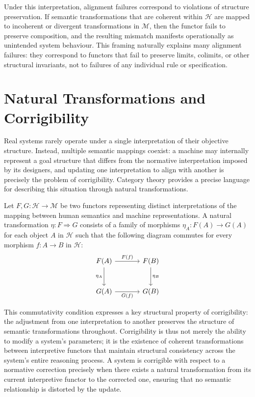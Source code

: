 \documentclass[12pt]{article}
\theoremstyle{definition}
\begin{document}
Under this interpretation, alignment failures correspond to violations of
structure preservation. If semantic transformations that are coherent within
$\mathcal{H}$ are mapped to incoherent or divergent transformations in
$\mathcal{M}$, then the functor fails to preserve composition, and the resulting
mismatch manifests operationally as unintended system behaviour. This framing
naturally explains many alignment failures: they correspond to functors that fail
to preserve limits, colimits, or other structural invariants, not to failures of
any individual rule or specification.

\section{Natural Transformations and Corrigibility}

Real systems rarely operate under a single interpretation of their objective
structure. Instead, multiple semantic mappings coexist: a machine may internally
represent a goal structure that differs from the normative interpretation imposed
by its designers, and updating one interpretation to align with another is
precisely the problem of corrigibility. Category theory provides a precise
language for describing this situation through natural transformations.

Let $F, G : \mathcal{H} \to \mathcal{M}$ be two functors representing distinct
interpretations of the mapping between human semantics and machine
representations. A natural transformation $\eta : F \Rightarrow G$ consists of
a family of morphisms $\eta_A : F(A) \to G(A)$ for each object $A$ in
$\mathcal{H}$ such that the following diagram commutes for every morphism $f :
A \to B$ in $\mathcal{H}$:
\begin{equation}
\begin{tikzcd}[column sep=large, row sep=large]
F(A) \arrow[r,"F(f)"] \arrow[d,"\eta_A"']
& F(B) \arrow[d,"\eta_B"] \\
G(A) \arrow[r,"G(f)"']
& G(B)
\end{tikzcd}
\end{equation}

This commutativity condition expresses a key structural property of
corrigibility: the adjustment from one interpretation to another preserves the
structure of semantic transformations throughout. Corrigibility is thus not
merely the ability to modify a system's parameters; it is the existence of
coherent transformations between interpretive functors that maintain structural
consistency across the system's entire reasoning process. A system is corrigible
with respect to a normative correction precisely when there exists a natural
transformation from its current interpretive functor to the corrected one,
ensuring that no semantic relationship is distorted by the update.
\end{document}
